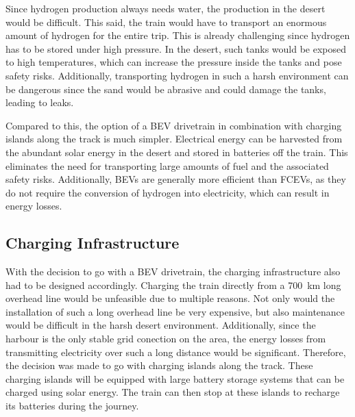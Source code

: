 Since hydrogen production always needs water, the production in the desert would be difficult. This said, the train would have to transport an enormous amount of hydrogen for the entire trip. This is already challenging since hydrogen has to be stored under high pressure. In the desert, such tanks would be exposed to high temperatures, which can increase the pressure inside the tanks and pose safety risks. Additionally, transporting hydrogen in such a harsh environment can be dangerous since the sand would be abrasive and could damage the tanks, leading to leaks. 

Compared to this, the option of a BEV drivetrain in combination with charging islands along the track is much simpler. Electrical energy can be harvested from the abundant solar energy in the desert and stored in batteries off the train. This eliminates the need for transporting large amounts of fuel and the associated safety risks. Additionally, BEVs are generally more efficient than FCEVs, as they do not require the conversion of hydrogen into electricity, which can result in energy losses.


\subsection{Charging Infrastructure}
With the decision to go with a BEV drivetrain, the charging infrastructure also had to be designed accordingly. Charging the train directly from a 700~km long overhead line would be unfeasible due to multiple reasons. Not only would the installation of such a long overhead line be very expensive, but also maintenance would be difficult in the harsh desert environment. Additionally, since the harbour is the only stable grid conection on the area, the energy losses from transmitting electricity over such a long distance would be significant. Therefore, the decision was made to go with charging islands along the track. These charging islands will be equipped with large battery storage systems that can be charged using solar energy. The train can then stop at these islands to recharge its batteries during the journey. 









